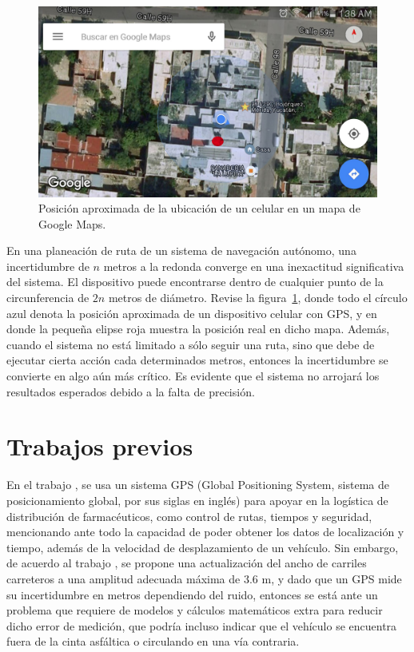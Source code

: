 \begin{figure}[ht]
\centering
\includegraphics[scale=0.14]{Figures/Pred}
\caption[Posición de celular en mapa.]{Posición aproximada de la ubicación de un celular en un mapa de Google Maps.}
\label{fig:Prec}
\end{figure}

En una planeación de ruta de un sistema de navegación autónomo, una incertidumbre de $n$ metros a la redonda converge en una inexactitud significativa del sistema. El dispositivo puede encontrarse dentro de cualquier punto de la circunferencia de $2n$ metros de diámetro. Revise la figura~\ref{fig:Prec}, donde todo el círculo azul denota la posición aproximada de un dispositivo celular con GPS, y en donde la pequeña elipse roja muestra la posición real en dicho mapa. Además, cuando el sistema no está limitado a sólo seguir una ruta, sino que debe de ejecutar cierta acción cada determinados metros, entonces la incertidumbre se convierte en algo aún más crítico. Es evidente que el sistema no arrojará los resultados esperados debido a la falta de precisión.

\section{Trabajos previos}
En el trabajo \cite{de2011diseno}, se usa un sistema GPS (Global Positioning System, sistema de posicionamiento global, por sus siglas en inglés) para apoyar en la logística de distribución de farmacéuticos, como control de rutas, tiempos y seguridad, mencionando ante todo la capacidad de poder obtener los datos de localización y tiempo, además de la velocidad de desplazamiento de un vehículo. Sin embargo, de acuerdo al trabajo \cite{mendoza2004recomendaciones}, se propone una actualización del ancho de carriles carreteros a una amplitud adecuada máxima de 3.6 m, y dado que un GPS mide su incertidumbre en metros dependiendo del ruido, entonces se está ante un problema que requiere de modelos y cálculos matemáticos extra para reducir dicho error de medición, que podría incluso indicar que el vehículo se encuentra fuera de la cinta asfáltica o circulando en una vía contraria. \\

